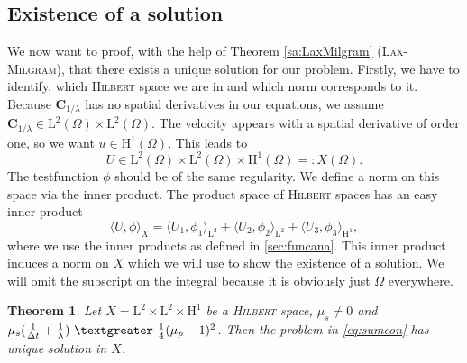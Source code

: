 \documentclass[12pt,a4paper,twoside, open=right]{scrreprt}
\theoremstyle{definition}
\theoremstyle{plain}
\newtheorem{sa}[auf]{Theorem}
\newcommand{\g}{~\textgreater ~}
\newcommand{\bfC}{\bm{C}}
\begin{document}
\subsection{Existence of a solution}
\label{sec:existence}
We now want to proof, with the help of Theorem \ref{sa:LaxMilgram} (\textsc{Lax-Milgram}), that there exists a unique solution for our problem. Firstly, we have to identify, which \textsc{Hilbert} space we are in and which norm corresponds to it. Because $\bfC_{1/\lambda}$ has no spatial derivatives in our equations, we assume $\bfC_{1/\lambda}\in \mathrm{L}^2(\Omega)\times \mathrm{L}^2(\Omega)$. The velocity appears with a spatial derivative of order one, so we want $u\in \mathrm{H}^1(\Omega)$. This leads to 
\begin{equation}
    U\in \mathrm{L}^2(\Omega)\times \mathrm{L}^2(\Omega)\times \mathrm{H}^1(\Omega)=:X(\Omega).
\end{equation} The testfunction $\phi$ should be of the same regularity. We define a norm on this space via the inner product. The product space of \textsc{Hilbert} spaces has an easy inner product
\begin{equation}
    \langle U,\phi\rangle_X = \langle U_1,\phi_1\rangle_{\mathrm{L}^2} +  \langle U_2,\phi_2\rangle_{\mathrm{L}^2} +\langle U_3,\phi_3\rangle_{\mathrm{H}^1},
\end{equation}
where we use the inner products as defined in \ref{sec:funcana}. This inner product induces a norm on $X$ which we will use to show the existence of a solution. We will omit the subscript on the integral because it is obviously just $\Omega$ everywhere.
\begin{sa}
    Let $X=\mathrm{L}^2\times\mathrm{L}^2\times \mathrm{H}^1$ be a \textsc{Hilbert} space, $\mu_s\neq 0$ and $\mu_s(\frac{1}{\Delta t}+\frac{1}{\lambda})\g \frac{1}{4}(\mu_p-1)^2$.
    Then the problem in \eqref{eq:sumcon} has unique solution  in $X$.
\end{sa}
\end{document}
